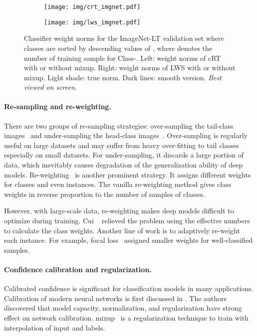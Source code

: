\documentclass[final]{cvpr}
\begin{document}
	\begin{figure*}[t]
		\centering
		\begin{subfigure}{0.48\linewidth}
			\texttt{[image: img/crt\_imgnet.pdf]}
		\end{subfigure}
		\hspace{12pt}
		\begin{subfigure}{0.48\linewidth}
			\texttt{[image: img/lws\_imgnet.pdf]}
		\end{subfigure}
		\vspace{-2pt}
		\caption{Classifier weight norms for the ImageNet-LT validation set where classes are sorted by descending values of , where  denotes the number of training sample for
			Class-. Left: weight norms of cRT with or without mixup. Right: weight norms of LWS with or without mixup. Light shade: true norm. Dark lines: smooth version. \textit{Best viewed on screen}.}
		\label{fig:norm}
		\vspace{-10pt}
	\end{figure*}
	
	\paragraph{Re-sampling and re-weighting.} There are two groups of re-sampling strategies: over-sampling the tail-class images~\cite{shen2016relay, buda2018systematic, byrd2019effect} and under-sampling the head-class images~\cite{japkowicz2002class, buda2018systematic}. Over-sampling is regularly useful on large datasets and may suffer from heavy over-fitting to tail classes especially on small datasets. For under-sampling, it discards a large portion of data, which inevitably causes degradation of the generalization ability of deep models. Re-weighting~\cite{huang2016learning, wang2017learning} is another prominent strategy. It assigns different weights for classes and even instances. The vanilla re-weighting method gives class weights in reverse proportion to the number of samples of classes. 
	
	However, with large-scale data, re-weighting makes deep models difficult to optimize during training. Cui \etal~\cite{effnum} relieved the problem using the effective numbers to calculate the class weights. Another line of work is to adaptively re-weight each instance. For example, focal loss~\cite{lin2017focal, focal_ca} assigned smaller weights for well-classified samples.
	
	\vspace{-10pt}
	\paragraph{Confidence calibration and regularization.} Calibrated confidence is significant for classification models in many applications. Calibration of modern neural networks is first discussed in \cite{calibration}. The authors discovered that model capacity, normalization, and regularization have strong effect on network calibration. mixup~\cite{mixup} is a regularization technique to train with interpolation of input and labels. 
	
\end{document}

